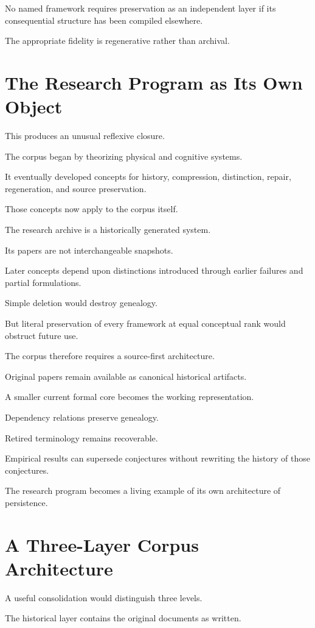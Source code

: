 \documentclass[11pt]{article}
\theoremstyle{remark}
\begin{document}
No named framework requires preservation as an independent layer if its consequential structure has been compiled elsewhere.

The appropriate fidelity is regenerative rather than archival.

\section{The Research Program as Its Own Object}

This produces an unusual reflexive closure.

The corpus began by theorizing physical and cognitive systems.

It eventually developed concepts for history, compression, distinction, repair, regeneration, and source preservation.

Those concepts now apply to the corpus itself.

The research archive is a historically generated system.

Its papers are not interchangeable snapshots.

Later concepts depend upon distinctions introduced through earlier failures and partial formulations.

Simple deletion would destroy genealogy.

But literal preservation of every framework at equal conceptual rank would obstruct future use.

The corpus therefore requires a source-first architecture.

Original papers remain available as canonical historical artifacts.

A smaller current formal core becomes the working representation.

Dependency relations preserve genealogy.

Retired terminology remains recoverable.

Empirical results can supersede conjectures without rewriting the history of those conjectures.

The research program becomes a living example of its own architecture of persistence.

\section{A Three-Layer Corpus Architecture}

A useful consolidation would distinguish three levels.

The historical layer contains the original documents as written.
\end{document}
